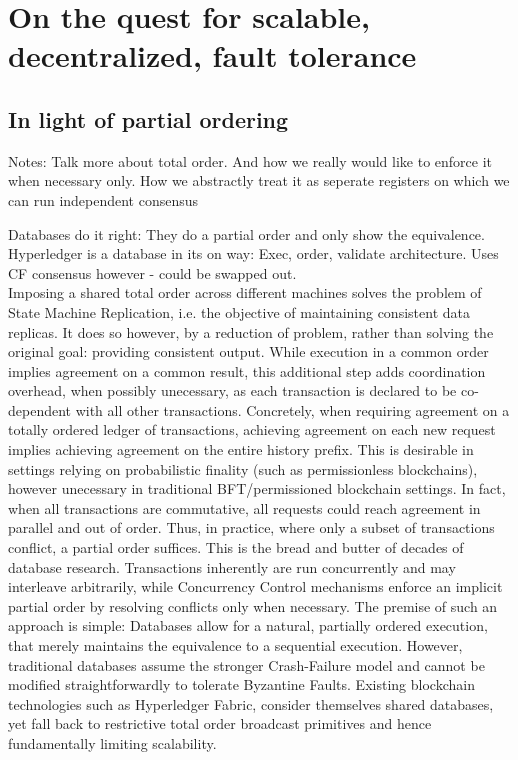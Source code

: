 \section{On the quest for scalable, decentralized, fault tolerance}


\subsection{In light of partial ordering}
Notes:
Talk more about total order. 
And how we really would like to enforce it when necessary only.
How we abstractly treat it as seperate registers on which we can run independent consensus

Databases do it right: They do a partial order and only show the equivalence. 
Hyperledger is a database in its on way: Exec, order, validate architecture. Uses CF consensus however - could be swapped out.\\


Imposing a shared total order across different machines solves the problem of State Machine Replication, i.e. the objective of maintaining consistent data replicas. It does so however, by a reduction of problem, rather than solving the original goal: providing consistent output. While execution in a common order implies agreement on a common result, this additional step adds coordination overhead, when possibly unecessary, as each transaction is declared to be co-dependent with all other transactions.
Concretely, when requiring agreement on a totally ordered ledger of transactions, achieving agreement on each new request implies achieving agreement on the entire history prefix. This is desirable in settings relying on probabilistic finality (such as permissionless blockchains), however unecessary in traditional BFT/permissioned blockchain settings. In fact, when all transactions are commutative, all requests could reach agreement in parallel and out of order. Thus, in practice, where only a subset of transactions conflict, a partial order suffices. 
This is the bread and butter of decades of database research. Transactions inherently are run concurrently and may interleave arbitrarily, while Concurrency Control mechanisms enforce an implicit partial order by resolving conflicts only when necessary. The premise of such an approach is simple: Databases allow for a natural, partially ordered execution, that merely maintains the equivalence to a sequential execution.
However, traditional databases assume the stronger Crash-Failure model and cannot be modified straightforwardly to tolerate Byzantine Faults. Existing blockchain technologies such as Hyperledger Fabric, consider themselves shared databases, yet fall back to restrictive total order broadcast primitives and hence fundamentally limiting scalability. 


